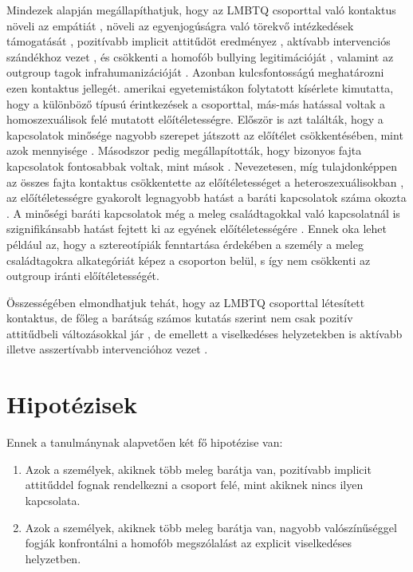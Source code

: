 Mindezek alapján megállapíthatjuk, hogy az LMBTQ csoporttal való kontaktus növeli az empátiát \parencite{abbott_cameron_2014}, növeli az egyenjogúságra való törekvő intézkedé\-sek támogatását \parencite{dasgupta_rivera_2008}, pozitívabb implicit attitűdöt eredményez \parencite{dasgupta_rivera_2008} , aktívabb intervenciós szándékhoz vezet \parencite{poteat_vecho_2016}, és csökkenti a homofób bullying legitimációját \parencite{zotti_carnaghi_piccoli_bianchi_2018}, valamint az outgroup  tagok infrahumanizációját \parencite{capozza_falvo_trifiletti_pagani_2014}. Azonban kulcsfontosságú meghatározni ezen kontaktus jellegét. \textcite{baunach_burgess_muse_2009} amerikai egyetemistákon folytatott kísérlete kimutatta, hogy a különböző típusú érintkezések a csoporttal, más-más hatással voltak a homoszexuálisok felé mutatott előítéletességre. Először is azt találták, hogy a kapcsolatok minősége nagyobb szerepet játszott az előítélet csökkentésében, mint azok mennyisége \parencite{baunach_burgess_muse_2009}. Másodszor pedig megállapították, hogy bizonyos fajta kapcsolatok fontosabbak voltak, mint mások \parencite{baunach_burgess_muse_2009}. Nevezetesen, míg tulajdonképpen az összes fajta kontaktus csökkentette az előítéletességet a heteroszexuálisokban \parencite{baunach_burgess_muse_2009}, az előítéletesség\-re gyakorolt legnagyobb hatást a baráti kapcsolatok száma okozta \parencite{baunach_burgess_muse_2009}. A minőségi baráti kapcsolatok még a meleg családtagokkal való kapcsolatnál is szignifikánsabb hatást fejtett ki az egyének előítéletességére \parencite{baunach_burgess_muse_2009}. Ennek oka lehet például az, hogy a sztereotípiák fenntartása érdekében a személy a meleg családtagokra alkategóriát képez a csoporton belül, s így nem csökkenti az outgroup iránti előítéletességét.
\\
\par
Összességében elmondhatjuk tehát, hogy az LMBTQ csoporttal létesített kontaktus, de főleg a barátság \parencite{baunach_burgess_muse_2009} számos kutatás szerint nem csak pozitív attitűdbeli változásokkal jár \parencite{dasgupta_rivera_2008}, de emellett a viselkedéses helyzetekben is aktívabb illetve asszertívabb intervencióhoz vezet \parencite{zotti_carnaghi_piccoli_bianchi_2018,}. 

\section{Hipotézisek}
Ennek a tanulmánynak alapvetően két fő hipotézise van:
\begin{enumerate}
	\item Azok a személyek, akiknek több meleg barátja van, pozitívabb implicit attitűddel fognak rendelkezni a csoport felé, mint akiknek nincs ilyen kapcsolata.
	\item Azok a személyek, akiknek több meleg barátja van, nagyobb valószínűséggel fogják konfrontálni a homofób megszólalást az explicit viselkedéses helyzetben.
\end{enumerate}


